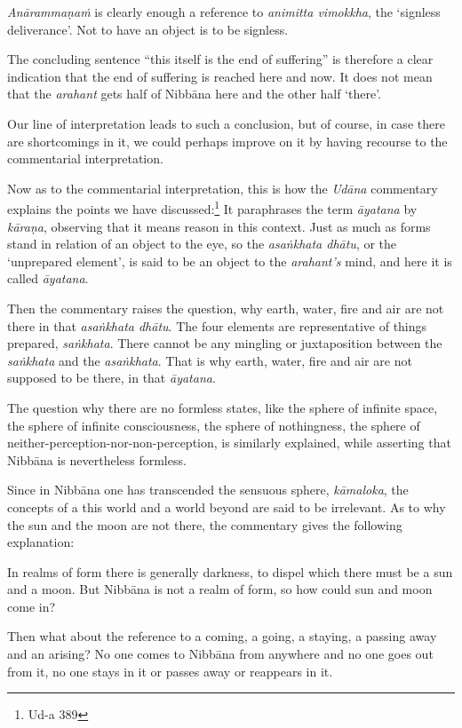 \emph{Anārammaṇaṁ} is clearly enough a reference to \emph{animitta vimokkha}, the `signless deliverance'. Not to have an object is to be signless.

The concluding sentence ``this itself is the end of suffering'' is therefore a clear indication that the end of suffering is reached here and now. It does not mean that the \emph{arahant} gets half of Nibbāna here and the other half `there'.

Our line of interpretation leads to such a conclusion, but of course, in case there are shortcomings in it, we could perhaps improve on it by having recourse to the commentarial interpretation.

Now as to the commentarial interpretation, this is how the \emph{Udāna} commentary explains the points we have discussed:\footnote{Ud-a 389} It paraphrases the term \emph{āyatana} by \emph{kāraṇa}, observing that it means reason in this context. Just as much as forms stand in relation of an object to the eye, so the \emph{asaṅkhata dhātu}, or the `unprepared element', is said to be an object to the \emph{arahant's} mind, and here it is called \emph{āyatana}.

Then the commentary raises the question, why earth, water, fire and air are not there in that \emph{asaṅkhata dhātu}. The four elements are representative of things prepared, \emph{saṅkhata}. There cannot be any mingling or juxtaposition between the \emph{saṅkhata} and the \emph{asaṅkhata}. That is why earth, water, fire and air are not supposed to be there, in that \emph{āyatana}.

The question why there are no formless states, like the sphere of infinite space, the sphere of infinite consciousness, the sphere of nothingness, the sphere of neither-perception-nor-non-perception, is similarly explained, while asserting that Nibbāna is nevertheless formless.

Since in Nibbāna one has transcended the sensuous sphere, \emph{kāmaloka}, the concepts of a this world and a world beyond are said to be irrelevant. As to why the sun and the moon are not there, the commentary gives the following explanation:

In realms of form there is generally darkness, to dispel which there must be a sun and a moon. But Nibbāna is not a realm of form, so how could sun and moon come in?

Then what about the reference to a coming, a going, a staying, a passing away and an arising? No one comes to Nibbāna from anywhere and no one goes out from it, no one stays in it or passes away or reappears in it.

